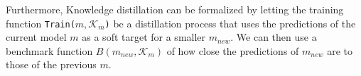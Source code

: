 \documentclass[../main.tex]{subfiles}
\begin{document}
    Furthermore, Knowledge distillation can be formalized by letting the training function \texttt{Train($m, \mathcal{K}_m$)} be a distillation process that uses the predictions of the current model $m$ as a soft target for a smaller $m_{new}$. We can then use a benchmark function $B(m_{new}, \mathcal{K}_m)$ of how close the predictions of $m_{new}$ are to those of the previous $m$.
        
\end{document}
